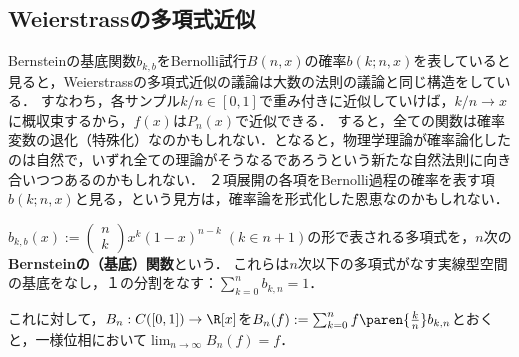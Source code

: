\documentclass[uplatex,dvipdfmx]{jsreport}
\begin{document}
\subsection{Weierstrassの多項式近似}

\begin{tcolorbox}[colframe=ForestGreen, colback=ForestGreen!10!white,breakable,colbacktitle=ForestGreen!40!white,coltitle=black,fonttitle=\bfseries\sffamily,
title=]
    Bernsteinの基底関数$b_{k,b}$をBernolli試行$B(n,x)$の確率$b(k;n,x)$を表していると見ると，Weierstrassの多項式近似の議論は大数の法則の議論と同じ構造をしている．
    すなわち，各サンプル$k/n\in[0,1]$で重み付きに近似していけば，$k/n\to x$に概収束するから，$f(x)$は$P_n(x)$で近似できる．
    すると，全ての関数は確率変数の退化（特殊化）なのかもしれない．となると，物理学理論が確率論化したのは自然で，いずれ全ての理論がそうなるであろうという新たな自然法則に向き合いつつあるのかもしれない．
    ２項展開の各項をBernolli過程の確率を表す項$b(k;n,x)$と見る，という見方は，確率論を形式化した恩恵なのかもしれない．
\end{tcolorbox}

\begin{definition}
    $b_{k,b}(x):=\begin{pmatrix}n\\k\end{pmatrix}x^k(1-x)^{n-k}\;(k\in n+1)$の形で表される多項式を，$n$次の\textbf{Bernsteinの（基底）関数}という．
    これらは$n$次以下の多項式がなす実線型空間の基底をなし，１の分割をなす：$\sum^n_{k=0}b_{k,n}=1$．
\end{definition}

これに対して，$B_n:C([0,1])\to\R[x]$を$B_n(f):=\sum_{k=0}^nf\paren{\frac{k}{n}}b_{k,n}$とおくと，一様位相において$\lim_{n\to\infty}B_n(f)=f$．
\end{document}
